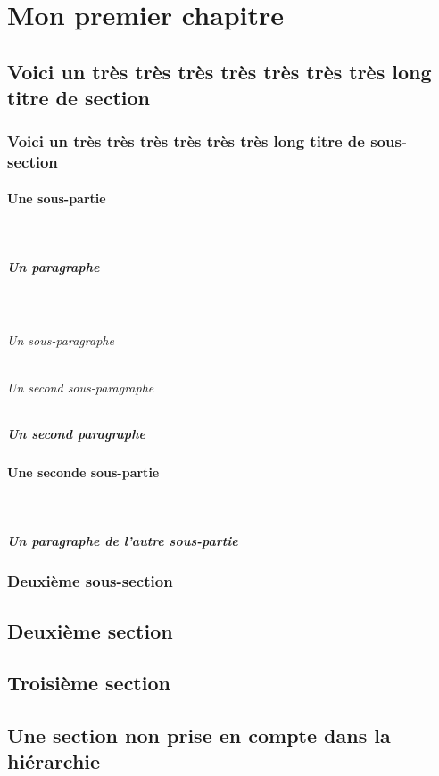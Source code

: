 \chapter{Mon premier chapitre}
\section[Un très long titre de section]{Voici un très très très très très très très long titre de section}
\subsection[Un très long titre de sous-section]{Voici un très très très très très très long titre de sous-section}
\blindtext
\subsubsection{Une sous-partie}
\blindtext[2]\\ 
\paragraph{Un paragraphe}
\blindtext[2]\\
\blindtext
\subparagraph{Un sous-paragraphe}
\blindtext[5]
\subparagraph{Un second sous-paragraphe}
\blindtext[4]
\paragraph{Un second paragraphe}
\blindtext[7]
\subsubsection{Une seconde sous-partie}
\blindtext[4]\\ 
\paragraph{Un paragraphe de l'autre sous-partie}
\blindtext[2]
\subsection{Deuxième sous-section}
\blindtext[11]
\section{Deuxième section}
\blindtext[25]
\section{Troisième section}
\blindtext[4]

\section*{Une section non prise en compte dans la hiérarchie}
\blindtext[7]